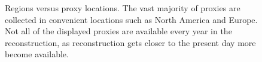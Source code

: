 \documentclass[12pt]{article}
\begin{document}
\begin{figure}
  \centering
  \caption{Regions versus proxy locations. The vast majority of proxies are collected in convenient locations such as North America and Europe. Not all of the displayed proxies are available every year in the reconstruction, as reconstruction gets closer to the present day more become available.}
  \label{regions}
\end{figure}
\end{document}
